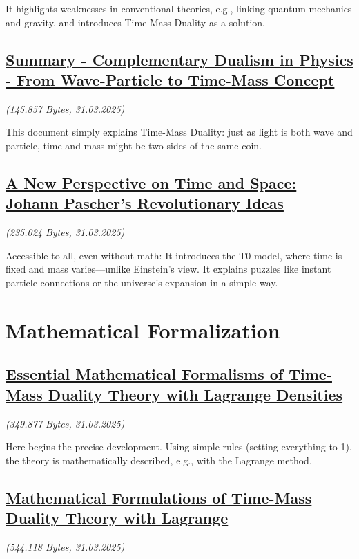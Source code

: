 \documentclass[a4paper,12pt]{article}
\newcommand{\repobase}{https://github.com/jpascher/T0-Time-Mass-Duality/tree/main/2/}
\begin{document}
	It highlights weaknesses in conventional theories, e.g., linking quantum mechanics and gravity, and introduces Time-Mass Duality as a solution.
	
	\subsection{\small\href{\repobase/pdf/English/Kurzgefasst - Komplementärer Dualismus in der Physik - Von Welle-Teilchen zum Zeit-Masse-Konzept_en.pdf}{Summary - Complementary Dualism in Physics - From Wave-Particle to Time-Mass Concept}}
	\textit{(145.857 Bytes, 31.03.2025)}
	
	This document simply explains Time-Mass Duality: just as light is both wave and particle, time and mass might be two sides of the same coin.
	
	\subsection{\small\href{\repobase/pdf/English/Eine neue Perspektive auf Zeit und Raum Johann Paschers revolutionäre Ideen_en.pdf}{A New Perspective on Time and Space: Johann Pascher’s Revolutionary Ideas}}
	\textit{(235.024 Bytes, 31.03.2025)}
	
	Accessible to all, even without math: It introduces the T0 model, where time is fixed and mass varies—unlike Einstein’s view. It explains puzzles like instant particle connections or the universe’s expansion in a simple way.
	
	\section{Mathematical Formalization}
	
	\subsection{\small\href{\repobase/pdf/English/Wesentliche mathematische Formalismen der Zeit-Masse-Dualitätstheorie mit Lagrange-Dichten_en.pdf}{Essential Mathematical Formalisms of Time-Mass Duality Theory with Lagrange Densities}}
	\textit{(349.877 Bytes, 31.03.2025)}
	
	Here begins the precise development. Using simple rules (setting everything to 1), the theory is mathematically described, e.g., with the Lagrange method.
	
	\subsection{\small\href{\repobase/pdf/English/Mathematische Formulierungen der Zeit-Masse-Dualitätstheorie mit Lagrange_en.pdf}{Mathematical Formulations of Time-Mass Duality Theory with Lagrange}}
	\textit{(544.118 Bytes, 31.03.2025)}
	
\end{document}
